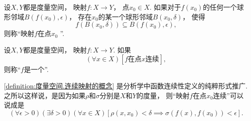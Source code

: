\begin{definition}
设\(X,Y\)都是度量空间，
映射\(f\colon X \to Y\)，
点\(x_0 \in X\).
如果对于\(f(x_0)\)的任何一个球形邻域\(B(f(x_0),\epsilon)\)，
存在\(x_0\)的某一个球形邻域\(B(x_0,\delta)\)，
使得\begin{equation*}
	f(B(x_0,\delta))
	\subseteq
	B(f(x_0),\epsilon),
\end{equation*}
则称“映射\(f\)在点\(x_0\) ”.
\end{definition}

\begin{definition}\label{definition:度量空间.连续映射的概念}
设\(X,Y\)都是度量空间，
映射\(f\colon X \to Y\).
如果\begin{equation*}
	(\forall x \in X)
	[\text{$f$在点$x$连续}],
\end{equation*}
则称“\(f\)是一个”.
\end{definition}

\begin{remark}
\cref{definition:度量空间.连续映射的概念} 是分析学中函数连续性定义的纯粹形式推广.
之所以这样说，是因为如果\(\rho\)和\(\sigma\)分别是\(X\)和\(Y\)的度量，
则“映射\(f\)在点\(x_0\)连续”可以说成是\begin{equation*}
	(\forall\epsilon>0)
	(\exists\delta>0)
	(\forall x \in X)
	[
		\rho(x,x_0)<\delta
		\implies
		\sigma(f(x),f(x_0))<\epsilon
	].
\end{equation*}
\end{remark}

